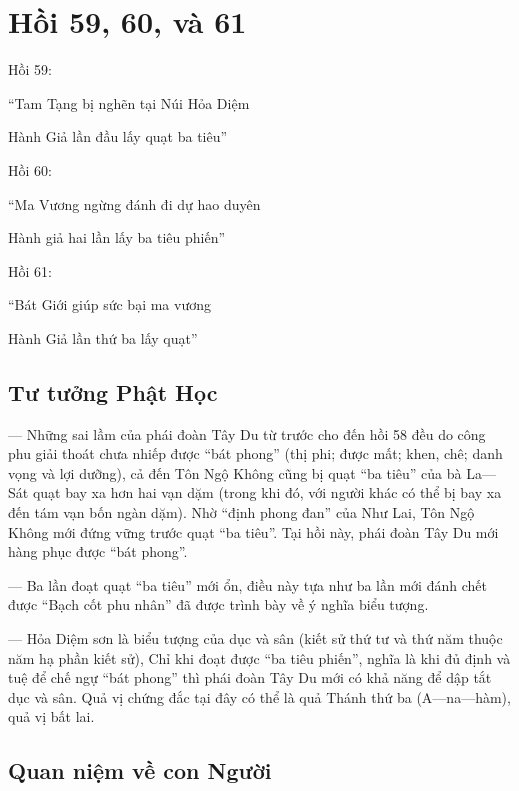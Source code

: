 \chapter{Hồi 59, 60, và 61} %
\label{cha:hoi_59_60}

Hồi 59:

\begin{itshape}
``Tam Tạng bị nghẽn tại Núi Hỏa Diệm

Hành Giả lần đầu lấy quạt ba tiêu''
\end{itshape}

Hồi 60:

\begin{itshape}
``Ma Vương ngừng đánh đi dự hao duyên

Hành giả hai lần lấy ba tiêu phiến''
\end{itshape}

Hồi 61:

\begin{itshape}
``Bát Giới giúp sức bại ma vương

Hành Giả lần thứ ba lấy quạt''
\end{itshape}

\section{Tư tưởng Phật Học} %
\label{sec:59_60_phat_hoc}

— Những sai lầm của phái đoàn Tây Du từ trước cho đến hồi 58 đều do công phu giải thoát chưa nhiếp được ``bát phong'' (thị phi; được mất; khen, chê; danh vọng và lợi dưỡng), cả đến Tôn Ngộ Không cũng bị quạt ``ba tiêu'' của bà La—Sát quạt bay xa hơn hai vạn dặm (trong khi đó, với người khác có thể bị bay xa đến tám vạn bốn ngàn dặm). Nhờ ``định phong đan'' của Như Lai, Tôn Ngộ Không mới đứng vững trước quạt ``ba tiêu''. Tại hồi này, phái đoàn Tây Du mới hàng phục được ``bát phong''.

— Ba lần đoạt quạt ``ba tiêu'' mới ổn, điều này tựa như ba lần mới đánh chết được ``Bạch cốt phu nhân'' đã được trình bày về ý nghĩa biểu tượng.

— Hỏa Diệm sơn là biểu tượng của dục và sân (kiết sử thứ tư và thứ năm thuộc năm hạ phần kiết sử), Chỉ khi đoạt được ``ba tiêu phiến'', nghĩa là khi đủ định và tuệ để chế ngự ``bát phong'' thì phái đoàn Tây Du mới có khả năng để dập tắt dục và sân. Quả vị chứng đắc tại đây có thể là quả Thánh thứ ba (A—na—hàm), quả vị bất lai.

\section{Quan niệm về con Người} %
\label{sec:59_60_con_nguoi}

